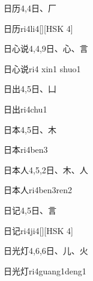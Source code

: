 \begin{Entry}{日历}{4,4}{⽇、⼚}
  \begin{Phonetics}{日历}{ri4li4}[][HSK 4]
  \end{Phonetics}
\end{Entry}

\begin{Entry}{日心说}{4,4,9}{⽇、⼼、⾔}
  \begin{Phonetics}{日心说}{ri4 xin1 shuo1}
  \end{Phonetics}
\end{Entry}

\begin{Entry}{日出}{4,5}{⽇、⼐}
  \begin{Phonetics}{日出}{ri4chu1}
  \end{Phonetics}
\end{Entry}

\begin{Entry}{日本}{4,5}{⽇、⽊}
  \begin{Phonetics}{日本}{ri4ben3}
  \end{Phonetics}
\end{Entry}

\begin{Entry}{日本人}{4,5,2}{⽇、⽊、⼈}
  \begin{Phonetics}{日本人}{ri4ben3ren2}
  \end{Phonetics}
\end{Entry}

\begin{Entry}{日记}{4,5}{⽇、⾔}
  \begin{Phonetics}{日记}{ri4ji4}[][HSK 4]
  \end{Phonetics}
\end{Entry}

\begin{Entry}{日光灯}{4,6,6}{⽇、⼉、⽕}
  \begin{Phonetics}{日光灯}{ri4guang1deng1}
  \end{Phonetics}
\end{Entry}

